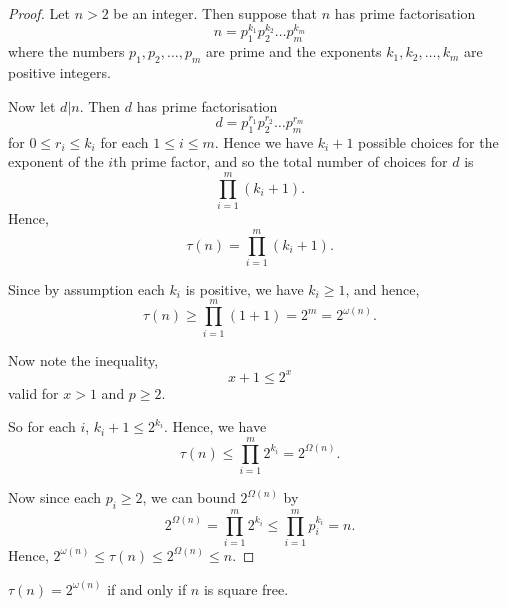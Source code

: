 \documentclass{unswmaths}
\begin{document}
\begin{proof}
    Let $n > 2$ be an integer. Then suppose that $n$ has prime factorisation
    \begin{equation*}
        n = p_1^{k_1}p_2^{k_2}\ldots p_m^{k_m}
    \end{equation*}
    where the numbers $p_1,p_2,\ldots,p_m$ are prime and the exponents $k_1,k_2,\ldots,k_m$
    are positive integers.
    
    Now let $d|n$. Then $d$ has prime factorisation
    \begin{equation*}
        d = p_1^{r_1}p_2^{r_2}\ldots p_m^{r_m}
    \end{equation*}
    for $0\leq r_i \leq k_i$ for each $1\leq i \leq m$. Hence we have $k_i+1$
    possible choices for the exponent of the $i$th prime factor, and so the total
    number of choices for $d$ is
    \begin{equation*}
        \prod_{i=1}^m (k_i+1).
    \end{equation*}
    Hence,
    \begin{equation*}
        \tau(n) = \prod_{i=1}^m (k_i+1).
    \end{equation*}
    
    Since by assumption each $k_i$ is positive, we have $k_i \geq 1$, and hence,
    \begin{equation*}
        \tau(n) \geq \prod_{i=1}^m (1+1) = 2^m = 2^{\omega(n)}.
    \end{equation*}
    
    Now note the inequality,
    \begin{equation*}
        x+1\leq 2^x
    \end{equation*}
    valid for $x > 1$ and $p \geq 2$.
    
    So for each $i$, $k_i+1\leq 2^{k_i}$.
    Hence, we have
    \begin{equation*}
        \tau(n) \leq \prod_{i=1}^m 2^{k_i} = 2^{\Omega(n)}.
    \end{equation*}
    
    Now since each $p_i\geq 2$, we can bound $2^{\Omega(n)}$
    by
    \begin{equation*}
        2^{\Omega(n)} = \prod_{i=1}^m 2^{k_i} \leq \prod_{i=1}^m p_i^{k_i} = n.
    \end{equation*}
    Hence, $2^{\omega(n)}\leq \tau(n) \leq 2^{\Omega(n)} \leq n$.
\end{proof}
\begin{lemma}
    $\tau(n) = 2^{\omega(n)}$ if and only if $n$ is square free.
\end{lemma}
\end{document}
